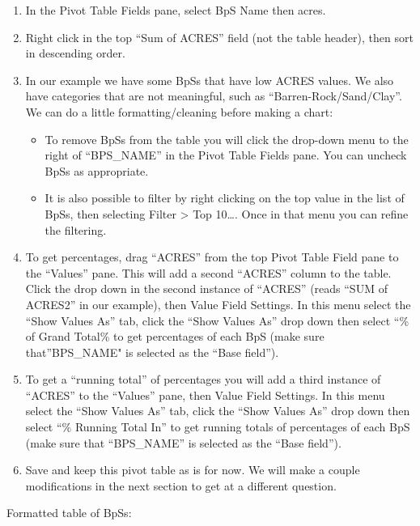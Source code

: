 \documentclass[
]{book}
\providecommand{\tightlist}{%
  \setlength{\itemsep}{0pt}\setlength{\parskip}{0pt}}
\begin{document}
\begin{enumerate}
\def\labelenumi{\arabic{enumi}.}
\tightlist
\item
  In the Pivot Table Fields pane, select BpS Name then acres.\\
\item
  Right click in the top ``Sum of ACRES'' field (not the table header), then sort in descending order.
\item
  In our example we have some BpSs that have low ACRES values. We also have categories that are not meaningful, such as ``Barren-Rock/Sand/Clay''. We can do a little formatting/cleaning before making a chart:

  \begin{itemize}
  \tightlist
  \item
    To remove BpSs from the table you will click the drop-down menu to the right of ``BPS\_NAME'' in the Pivot Table Fields pane. You can uncheck BpSs as appropriate.
  \item
    It is also possible to filter by right clicking on the top value in the list of BpSs, then selecting Filter \textgreater{} Top 10\ldots. Once in that menu you can refine the filtering.
  \end{itemize}
\item
  To get percentages, drag ``ACRES'' from the top Pivot Table Field pane to the ``Values'' pane. This will add a second ``ACRES'' column to the table. Click the drop down in the second instance of ``ACRES'' (reads ``SUM of ACRES2'' in our example), then Value Field Settings. In this menu select the ``Show Values As'' tab, click the ``Show Values As'' drop down then select ``\% of Grand Total\% to get percentages of each BpS (make sure that''BPS\_NAME" is selected as the ``Base field'').\\
\item
  To get a ``running total'' of percentages you will add a third instance of ``ACRES'' to the ``Values'' pane, then Value Field Settings. In this menu select the ``Show Values As'' tab, click the ``Show Values As'' drop down then select ``\% Running Total In'' to get running totals of percentages of each BpS (make sure that ``BPS\_NAME'' is selected as the ``Base field'').
\item
  Save and keep this pivot table as is for now. We will make a couple modifications in the next section to get at a different question.
\end{enumerate}

Formatted table of BpSs:
\end{document}
